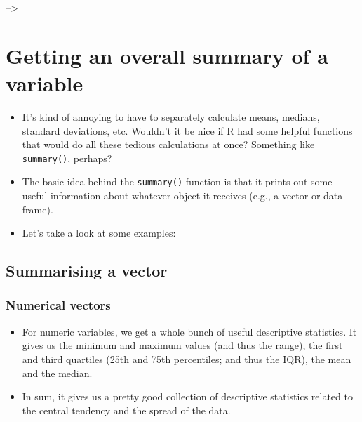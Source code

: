 \documentclass[
]{book}
\newenvironment{Shaded}{\begin{snugshade}}{\end{snugshade}}
\newcommand{\FunctionTok}[1]{\textcolor[rgb]{0.00,0.00,0.00}{#1}}
\newcommand{\NormalTok}[1]{#1}
\newcommand{\SpecialCharTok}[1]{\textcolor[rgb]{0.00,0.00,0.00}{#1}}
\providecommand{\tightlist}{%
  \setlength{\itemsep}{0pt}\setlength{\parskip}{0pt}}
\begin{document}
--\textgreater{}

\hypertarget{summary}{%
\section{Getting an overall summary of a variable}\label{summary}}

\begin{itemize}
\tightlist
\item
  It's kind of annoying to have to separately calculate means, medians, standard deviations, etc. Wouldn't it be nice if R had some helpful functions that would do all these tedious calculations at once? Something like \texttt{summary()}, perhaps?
\item
  The basic idea behind the \texttt{summary()} function is that it prints out some useful information about whatever object it receives (e.g., a vector or data frame).
\item
  Let's take a look at some examples:
\end{itemize}

\hypertarget{summarising-a-vector}{%
\subsection{Summarising a vector}\label{summarising-a-vector}}

\hypertarget{numerical-vectors}{%
\subsubsection{Numerical vectors}\label{numerical-vectors}}

\begin{itemize}
\tightlist
\item
  For numeric variables, we get a whole bunch of useful descriptive statistics. It gives us the minimum and maximum values (and thus the range), the first and third quartiles (25th and 75th percentiles; and thus the IQR), the mean and the median.
\item
  In sum, it gives us a pretty good collection of descriptive statistics related to the central tendency and the spread of the data.
\end{itemize}

\begin{Shaded}
\end{Shaded}
\end{document}
